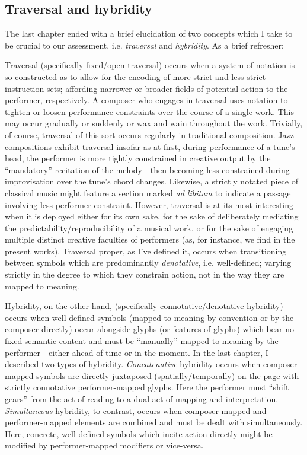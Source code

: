 \subsection{Traversal and hybridity}
    
        The last chapter ended with a brief elucidation of two concepts which I take to be crucial to our assessment, i.e. \textit{traversal} and \textit{hybridity}. As a brief refresher:
    
        Traversal (specifically fixed/open traversal) occurs when a system of notation is so constructed as to allow for the encoding of more-strict and less-strict instruction sets; affording narrower or broader fields of potential action to the performer, respectively. A composer who engages in traversal uses notation to tighten or loosen performance constraints over the course of a single work. This may occur gradually or suddenly or wax and wain throughout the work. Trivially, of course, traversal of this sort occurs regularly in traditional composition. Jazz compositions exhibit traversal insofar as at first, during performance of a tune's head, the performer is more tightly constrained in creative output by the ``mandatory'' recitation of the melody---then becoming less constrained during improvisation over the tune's chord changes. Likewise, a strictly notated piece of classical music might feature a section marked \textit{ad libitum} to indicate a passage involving less performer constraint. However, traversal is at its most interesting when it is deployed either for its own sake, for the sake of deliberately mediating the predictability/reproducibility of a musical work, or for the sake of engaging multiple distinct creative faculties of performers (as, for instance, we find in the present works). Traversal proper, as I've defined it, occurs when transitioning between symbols which are predominantly \textit{denotative}, i.e. well-defined; varying strictly in the degree to which they constrain action, not in the way they are mapped to meaning.

        Hybridity, on the other hand, (specifically connotative/denotative hybridity) occurs when well-defined symbols (mapped to meaning by convention or by the composer directly) occur alongside glyphs (or features of glyphs) which bear no fixed semantic content and must be ``manually'' mapped to meaning by the performer---either ahead of time or in-the-moment. In the last chapter, I described two types of hybridity. \textit{Concatenative} hybridity occurs when composer-mapped symbols are directly juxtaposed (spatially/temporally) on the page with strictly connotative performer-mapped glyphs. Here the performer must ``shift gears'' from the act of reading to a dual act of mapping and interpretation. \textit{Simultaneous} hybridity, to contrast, occurs when composer-mapped and performer-mapped elements are combined and must be dealt with simultaneously. Here, concrete, well defined symbols which incite action directly might be modified by performer-mapped modifiers or vice-versa. 

